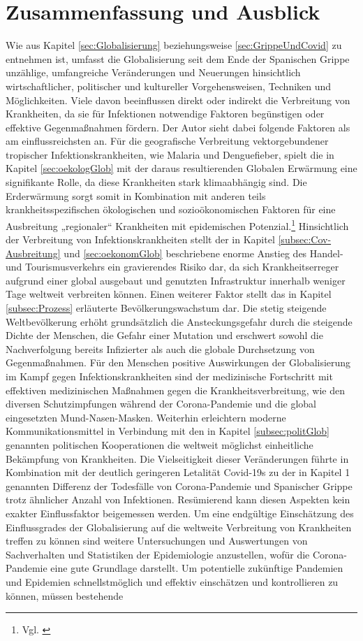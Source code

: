 \documentclass[12pt]{article}
\begin{document}
\section{Zusammenfassung und Ausblick}
Wie aus Kapitel \ref{sec:Globalisierung} beziehungsweise \ref{sec:GrippeUndCovid} zu entnehmen ist, umfasst die Globalisierung seit dem Ende der Spanischen Grippe unzählige, umfangreiche Veränderungen und Neuerungen hinsichtlich wirtschaftlicher, politischer und kultureller Vorgehensweisen, Techniken und Möglichkeiten. Viele davon beeinflussen direkt oder indirekt die Verbreitung von Krankheiten, da sie für Infektionen notwendige Faktoren begünstigen oder effektive Gegenmaßnahmen fördern. Der Autor sieht dabei folgende Faktoren als am einflussreichsten an. Für die geografische Verbreitung vektorgebundener tropischer Infektionskrankheiten, wie Malaria und Denguefieber, spielt die in Kapitel \ref{sec:oekologGlob} mit der daraus resultierenden Globalen Erwärmung eine signifikante Rolle, da diese Krankheiten stark klimaabhängig sind. Die Erderwärmung sorgt somit in Kombination mit anderen teils krankheitsspezifischen ökologischen und sozioökonomischen Faktoren für eine Ausbreitung „regionaler“ Krankheiten mit epidemischen Potenzial.\footnote{Vgl. \cite{Ebert2005}} Hinsichtlich der Verbreitung von Infektionskrankheiten stellt der in Kapitel \ref{subsec:Cov-Ausbreitung} und \ref{sec:oekonomGlob} beschriebene enorme Anstieg des Handel- und Tourismusverkehrs ein gravierendes Risiko dar, da sich Krankheitserreger aufgrund einer global ausgebaut und genutzten Infrastruktur innerhalb weniger Tage weltweit verbreiten können. Einen weiterer Faktor stellt das in Kapitel \ref{subsec:Prozess} erläuterte Bevölkerungswachstum dar. Die stetig steigende Weltbevölkerung erhöht grundsätzlich die Ansteckungsgefahr durch die steigende Dichte der Menschen, die Gefahr einer Mutation und erschwert sowohl die Nachverfolgung bereits Infizierter als auch die globale Durchsetzung von Gegenmaßnahmen. Für den Menschen positive Auswirkungen der Globalisierung im Kampf gegen Infektionskrankheiten sind der medizinische Fortschritt mit effektiven medizinischen Maßnahmen gegen die Krankheitsverbreitung, wie den diversen Schutzimpfungen während der Corona-Pandemie und die global eingesetzten Mund-Nasen-Masken. Weiterhin erleichtern moderne Kommunikationsmittel in Verbindung mit den in Kapitel \ref{subsec:politGlob} genannten politischen Kooperationen die weltweit möglichst einheitliche Bekämpfung von Krankheiten. Die Vielseitigkeit dieser Veränderungen führte in Kombination mit der deutlich geringeren Letalität Covid-19s zu der in Kapitel 1 genannten Differenz der Todesfälle von Corona-Pandemie und Spanischer Grippe trotz ähnlicher Anzahl von Infektionen. Resümierend kann diesen Aspekten kein exakter Einflussfaktor beigemessen werden. Um eine endgültige Einschätzung des Einflussgrades der Globalisierung auf die weltweite Verbreitung von Krankheiten treffen zu können sind weitere Untersuchungen und Auswertungen von Sachverhalten und Statistiken der Epidemiologie anzustellen, wofür die Corona-Pandemie eine gute Grundlage darstellt. Um potentielle zukünftige Pandemien und Epidemien schnellstmöglich und effektiv einschätzen und kontrollieren zu können, müssen bestehende 
\end{document}
